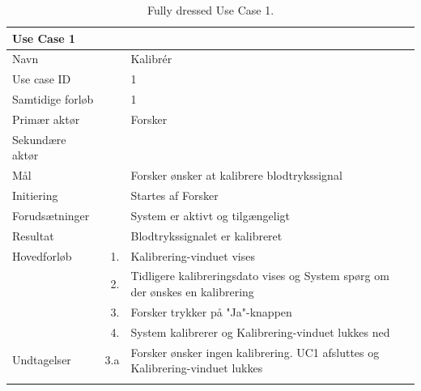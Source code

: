 \begin{longtabu} to  %
    {\large \textbf{Use Case 1}} && \\
    \toprule
    Navn &&    Kalibrér\\
    Use case ID &&    1\\
    Samtidige forløb &&    1\\
    Primær aktør &&    Forsker\\
    Sekundære aktør &&	 \\
    Mål &&    Forsker ønsker at kalibrere blodtrykssignal\\
    Initiering &&	Startes af Forsker\\
    Forudsætninger &&  System er aktivt og tilgængeligt\\
    Resultat &&		Blodtrykssignalet er kalibreret                         \\ \midrule
    Hovedforløb &    1. &	 Kalibrering-vinduet vises\\[-1ex]  				
    			&    2. &    Tidligere kalibreringsdato vises og System spørg om der ønskes en kalibrering \\[-1ex]
    			&    3.	&	 Forsker trykker på "Ja"\--knappen \\
                &    4.	&	 System kalibrerer og Kalibrering-vinduet lukkes ned \newline\\ \midrule
                
    Undtagelser &    3.a &   Forsker ønsker ingen kalibrering. UC1 afsluttes og Kalibrering-vinduet lukkes  \\ \bottomrule
\caption{Fully dressed Use Case 1.}
\label{UC1}
\end{longtabu}


